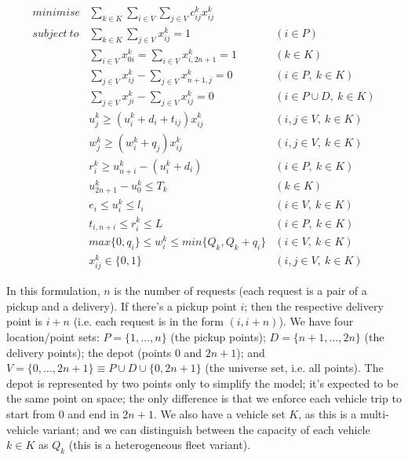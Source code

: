 \documentclass[english,plano-doutorado,twoside]{iiufrgs}
\begin{document}
\begin{align}
minimise &\sum_{k \in K}\sum_{i \in V}\sum_{j \in V} c^{k}_{ij} x^{k}_{ij} &\label{eq:objfun}\\
subject~to &\sum_{k \in K}\sum_{j \in V} x^{k}_{ij} = 1 & (i \in P)\label{eq:no_divide}\\
           &\sum_{i \in V}x^{k}_{0i} = \sum_{i \in V}x^{k}_{i,2n+1} = 1 & (k \in K)\label{eq:end_and_begin}\\
           &\sum_{j \in V}x^{k}_{ij} - \sum_{j \in V}x^{k}_{n+1,j} = 0& (i \in P,~k \in K)\label{eq:same_request_same_vehicle}\\
           &\sum_{j \in V}x^{k}_{ji} - \sum_{j \in V}x^{k}_{ij} = 0& (i \in P\cup D,~k \in K)\label{eq:no_bus_teleport}\\
           &u^{k}_{j} \geq (u^{k}_{i} + d_i + t_{ij})x^{k}_{ij} & (i,j \in V,~k\in K)\label{eq:travel_times}\\
           &w^{k}_{j} \geq (w^{k}_{i} + q_j)x^{k}_{ij} & (i,j \in V,~k\in K)\label{eq:capacity}\\
           &r^{k}_{i} \geq u^{k}_{n+i} -(u^{k}_{i} + d_i) & (i \in P,~k\in K)\label{eq:ride_time}\\
           &u^{k}_{2n+1} - u^k_0 \leq T_k & (k \in K)\label{eq:trip_time}\\
           &e_i \leq u^k_i \leq l_i & (i \in V,~k\in K)\label{eq:time_windows}\\
           &t_{i,n+i} \leq r^k_i \leq L & (i \in P,~k\in K)\label{eq:max_ride_time}\\
           &max\{0,q_i\} \leq w^k_i \leq min\{Q_k, Q_k + q_i\}&(i \in V,~k\in K)\label{eq:capacity2}\\
           &x^{k}_{ij} \in \{0,1\}&(i,j \in V,~k\in K)\label{eq:boolean}
\end{align}

In this formulation, \(n\) is the number of requests (each request is a pair of a pickup and a delivery). If there's a pickup point \(i\); then the respective delivery point is \(i + n\) (i.e. each request is in the form \((i, i + n)\)). We have four location/point sets: \(P = \{1, \dots, n\}\) (the pickup points); \(D = \{n+1, \dots, 2n\}\) (the delivery points); the depot (points \(0\) and \(2n + 1\)); and \(V = \{0, \dots, 2n + 1\} \equiv P \cup D \cup \{0, 2n + 1\}\) (the universe set, i.e. all points). The depot is represented by two points only to simplify the model; it's expected to be the same point on space; the only difference is that we enforce each vehicle trip to start from \(0\) and end in \(2n+1\). We also have a vehicle set \(K\), as this is a multi-vehicle variant; and we can distinguish between the capacity of each vehicle \(k \in K\) as \(Q_k\) (this is a heterogeneous fleet variant).
\end{document}
